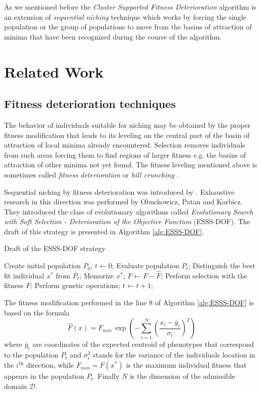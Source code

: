 As we mentioned before the \textit{Cluster Supported Fitness
Deterioration} algorithm is an extension of  \textit{sequential niching}
technique which works by forcing the single population or the group of
populations to move from the basins of attraction of minima that have been 
recognized during the course of the algorithm.

\section{Related Work}

\subsection{Fitness deterioration techniques}
\label{sec:Fdt}



The behavior of individuals suitable for niching
may be obtained by the proper
fitness modification that leads to its leveling 
on the central part of the basin of attraction of local minima already encountered.
Selection removes individuals from such areas forcing them to find regions of
larger fitness e.g. the basins of attraction of other minima not yet found.
The fitness leveling mentioned above is sometimes called
\textit{fitness deterioration} \cite{Obuchowicz1997} 
or \textit{hill crunching} \cite{SchaeferAdamskaTelega2004}.

Sequential niching by fitness deterioration was introduced by 
\cite{BeasleyBullMartin1993}.
Exhaustive research in this direction was performed by
Obuchowicz, Patan and Korbicz. They introduced the class
of evolutionary algorithms called \textit{Evolutionary Search 
with Soft Selection - Deterioration of the Objective Function}
(ESSS-DOF). 
The draft of this strategy
is presented in Algorithm \ref{alg:ESSS-DOF}.
\begin{algorithm}
\caption{Draft of the ESSS-DOF strategy}
\label{alg:ESSS-DOF}
\begin{algorithmic}[1]
\STATE Create initial population $P_0$;
\STATE $t \leftarrow 0$; 
\REPEAT
\STATE Evaluate population $P_t$;
\STATE Distinguish the best fit individual $x^*$ from $P_t$;
\STATE Memorize $x^*$;
\STATE $F \leftarrow F - \hat{F}$;
\ENDIF
\STATE Perform selection with the fitness $F$;
\STATE Perform genetic operations;
\STATE $t \leftarrow t+1$;
\end{algorithmic}
\end{algorithm}
The fitness modification performed in the line 8 of Algorithm \ref{alg:ESSS-DOF}
is based on the formula
\begin{equation}
\label{FitnessDeterioration_1}
\hat{F}(x) = F_{min} \, \exp \left( - \sum_{i = 1}^N 
\left( \frac{x_i - \bar{y}_i}{\sigma_i} \right)^2 \right)
\end{equation}
where $\bar{y}_i$ are coordinates of the expected centroid of phenotypes that 
correspond to the population $P_t$ and $\sigma_i^2$
stands for the variance of the individuals location in the $i^{\text{th}}$ 
direction, while $F_{min} = F(x^*)$ is the maximum individual fitness that appears 
in the population $P_t$. Finally $N$ is the dimension of the admissible domain
$\mathcal{D}$.

